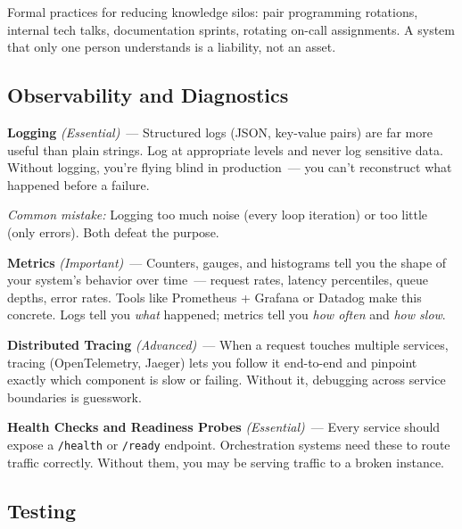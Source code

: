 Formal practices for reducing knowledge silos: pair programming rotations, internal tech talks, documentation sprints, rotating on-call assignments. A system that only one person understands is a liability, not an asset.

\label{writing-good-code:full-quality-framework-reference}

\subsection*{Observability and Diagnostics}\label{writing-good-code:observability-and-diagnostics}

\textbf{Logging} \emph{(Essential)}~--- Structured logs (JSON, key-value pairs) are far more useful than plain strings. Log at appropriate levels and never log sensitive data. Without logging, you're flying blind in production~--- you can't reconstruct what happened before a failure.

\begin{notebox}

\emph{Common mistake:} Logging too much noise (every loop iteration) or too little (only errors). Both defeat the purpose.

\end{notebox}

\noindent{}\textbf{Metrics} \emph{(Important)}~--- Counters, gauges, and histograms tell you the shape of your system's behavior over time~--- request rates, latency percentiles, queue depths, error rates. Tools like Prometheus + Grafana or Datadog make this concrete. Logs tell you \emph{what} happened; metrics tell you \emph{how often} and \emph{how slow}.

\textbf{Distributed Tracing} \emph{(Advanced)}~--- When a request touches multiple services, tracing (OpenTelemetry, Jaeger) lets you follow it end-to-end and pinpoint exactly which component is slow or failing. Without it, debugging across service boundaries is guesswork.

\textbf{Health Checks and Readiness Probes} \emph{(Essential)}~--- Every service should expose a \texttt{/health} or \texttt{/ready} endpoint. Orchestration systems need these to route traffic correctly. Without them, you may be serving traffic to a broken instance.

\subsection*{Testing}\label{writing-good-code:testing}

